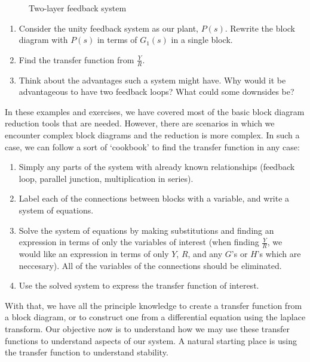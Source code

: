 \begin{exercise}
\begin{figure}[H]
\begin{tikzpicture}[x=0.75pt,y=0.75pt,yscale=-0.7,xscale=0.7]
\end{tikzpicture}

    \caption{Two-layer feedback system}
    \label{fig:double feedback}
\end{figure}

\begin{enumerate}[label=\alph*.]
    \item Consider the unity feedback system as our plant, $P(s)$. Rewrite the block diagram with $P(s)$ in terms of $G_1(s)$ in a single block.
    \item Find the transfer function from $\frac{Y}{R}$.
    \item Think about the advantages such a system might have. Why would it be advantageous to have two feedback loops? What could some downsides be?
\end{enumerate}    
\end{exercise}

In these examples and exercises, we have covered most of the basic block diagram reduction tools that are needed. However, there are scenarios in which we encounter complex block diagrams and the reduction is more complex. In such a case, we can follow a sort of `cookbook' to find the transfer function in any case:
\begin{enumerate}
    \item Simply any parts of the system with already known relationships (feedback loop, parallel junction, multiplication in series).
    \item Label each of the connections between blocks with a variable, and write a system of equations.
    \item Solve the system of equations by making substitutions and finding an expression in terms of only the variables of interest (when finding $\frac{Y}{R}$, we would like an expression in terms of only $Y$, $R$, and any $G$'s or $H$'s which are neccesary). All of the variables of the connections should be eliminated.
    \item Use the solved system to express the transfer function of interest.
\end{enumerate}

With that, we have all the principle knowledge to create a transfer function from a block diagram, or to construct one from a differential equation using the \gls{laplace transform}. Our objective now is to understand how we may use these transfer functions to understand aspects of our system. A natural starting place is using the transfer function to understand stability.

